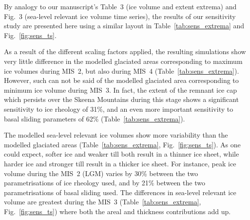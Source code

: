 \clearpage  %

By analogy to our manuscript's Table~3 (ice volume and extent extrema) and
Fig.~3 (sea-level relevant ice volume time series), the results of our
sensitivity study are presented here using a similar layout in
Table~\ref{tab:sens_extrema} and Fig.~\ref{fig:sens_ts}.

As a result of the different scaling factors applied, the resulting simulations
show very little difference in the modelled glaciated areas corresponding to
maximum ice volumes during MIS~2, but also during MIS~4
(Table~\ref{tab:sens_extrema}). However, such can not be said of the modelled
glaciated area corresponding to minimum ice volume during MIS~3. In fact, the
extent of the remnant ice cap which persists over the Skeena Mountains during
this stage shows a significant sensitivity to ice rheology of 31\%, and
an even more important sensitivity to basal sliding parameters of 62\%
(Table~\ref{tab:sens_extrema}).

The modelled sea-level relevant ice volumes show more variability than the
modelled glaciated areas (Table~\ref{tab:sens_extrema},
Fig.~\ref{fig:sens_ts}). As one could expect, softer ice and weaker till both
result in a thinner ice sheet, while harder ice and stronger till result in a
thicker ice sheet. For instance, peak ice volume during the MIS~2 (LGM) varies
by 30\% between the two parametrisations of ice rheology used, and by 21\%
between the two parametrisations of basal sliding used. The differences in
sea-level relevant ice volume are greatest during the MIS~3
(Table~\ref{tab:sens_extrema}, Fig.~\ref{fig:sens_ts}) where both the areal and
thickness contributions add up.

